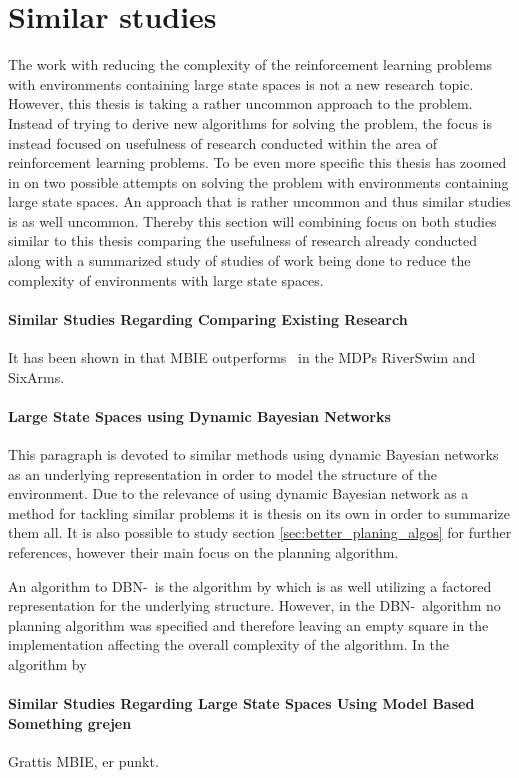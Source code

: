 \section{Similar studies }
The work with reducing the complexity of the reinforcement learning problems with environments containing large state spaces is not a new research topic. However, this thesis is taking a rather uncommon approach to the problem. Instead of trying to derive new algorithms for solving the problem, the focus is instead focused on usefulness of research conducted within the area of reinforcement learning problems. To be even more specific this thesis has zoomed in on two possible attempts on solving the problem with environments containing large state spaces. An approach that is rather uncommon and thus similar studies is as well uncommon. 
Thereby this section will combining focus on both studies similar to this thesis comparing the usefulness of research already conducted along with a summarized study of studies of work being done to reduce the complexity of environments with large state spaces.


\paragraph{Similar Studies Regarding Comparing Existing Research}
It has been shown in \parencite{strehl2004empirical} that MBIE outperforms \etre\ in the MDPs RiverSwim and SixArms. \parencite{dietterich2013pac}


\paragraph{Large State Spaces using Dynamic Bayesian Networks}
This paragraph is devoted to similar methods using dynamic Bayesian networks as an underlying representation in order to model the structure of the environment. Due to the relevance of using dynamic Bayesian network as a method for tackling similar problems it is thesis on its own in order to summarize them all. It is also possible to study section \ref{sec:better_planing_algos} for further references, however their main focus on the planning algorithm.

An algorithm to DBN-\etre\ is the algorithm by \textcite{ross2012model} which is as well utilizing a factored representation for the underlying structure. However, in the DBN-\etre\ algorithm no planning algorithm was specified and therefore leaving an empty square in the implementation affecting the overall complexity of the algorithm. In the algorithm by \textcite{ross2012model} 


\paragraph{Similar Studies Regarding Large State Spaces Using Model Based Something grejen}
Grattis MBIE, er punkt.